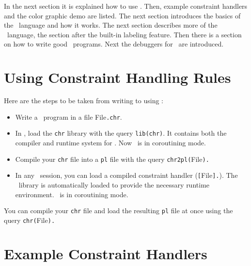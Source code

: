 In the next section
it is explained how to use \chrs.
 Then,
example constraint handlers and the color graphic
demo are listed.
 The next
section introduces the basics of the \chr\ language and how it works.  
The next section describes more of the \chr\ language,
the section after the built-in labeling feature.
Then there is
a section on how to write good \chr\ programs.  Next the debuggers for
\chrs\ are introduced.  


\section{Using Constraint Handling Rules}

Here are the steps to be taken from writing to using \chrs:
\begin{itemize}
 \item Write a \chr\ program in a file 
File\verb/.chr/.

 \item In \eclipse, load the {\tt chr} library with the query
\verb/lib(chr)/. It contains both the compiler and runtime system for
\chrs. Now \eclipse\ is in coroutining mode.

 \item Compile your \verb/chr/ file into a \verb/pl/ file with the query
 \verb/chr2pl(/File\verb/)./

\item In any \eclipse\ session, you can load a compiled constraint handler
(\verb/[/File\verb/]./). The \chr\ library is automatically loaded
to provide the necessary runtime environment. \eclipse\ is in coroutining mode.

\end{itemize}
You can compile your \verb/chr/ file and load the resulting \verb/pl/ file
at once using the query \verb/chr(/File\verb/)./



\section{Example Constraint Handlers}

